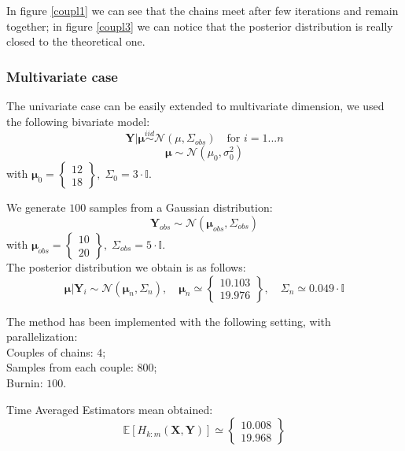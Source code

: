 \documentclass {article}
\begin{document}
In figure \ref{coupl1} we can see that the chains meet after few iterations and remain together; in figure \ref{coupl3} we can notice that the posterior distribution is really closed to the theoretical one.

\newpage

\subsubsection{Multivariate case}

The univariate case can be easily extended to multivariate dimension, we used the following bivariate model:
$$ \boldsymbol{Y} | \boldsymbol{\mu} \overset{iid}{\sim} \mathcal{N}(\mu, \Sigma_{obs} ) \quad \text{for } i = 1 ... n $$
$$ \boldsymbol{\mu}  \sim \mathcal{N}(\mu_0, \sigma_0^2)$$
with $\boldsymbol{\mu}_0 =
\begin{Bmatrix}    %
12 \\
18
\end{Bmatrix} 
, \; \Sigma_0 = 3 \cdot \mathbb{I}$.

We generate $100$ samples from a Gaussian distribution:
$$
\boldsymbol{Y}_{obs} \sim \mathcal{N}(\boldsymbol{\mu}_{obs}, \Sigma_{obs})
$$
with
$  \boldsymbol{\mu}_{obs} =
\begin{Bmatrix}  
	10 \\
 	20
\end{Bmatrix}  
, \;  \Sigma_{obs}  = 5 \cdot \mathbb{I}
$.\\

The posterior distribution we obtain is as follows:
$$  \boldsymbol{\mu} | \boldsymbol{Y}_i \sim \mathcal{N}(\boldsymbol{\mu}_n, \Sigma_n), 
\quad \boldsymbol{\mu}_n \simeq \begin{Bmatrix}    %
10.103 \\
19.976
\end{Bmatrix} ,
\quad
\Sigma_n
\simeq 0.049 \cdot \mathbb{I} $$

The method has been implemented with the following setting, with parallelization:\\
Couples of chains: $4$;\\
Samples from each couple: $800$;\\
Burnin: $100$.



Time Averaged Estimators mean obtained:
$$ \mathbb{E}[H_{k:m}(\boldsymbol{X},\boldsymbol{Y})] \simeq \begin{Bmatrix}    %
10.008 \\
19.968
\end{Bmatrix}$$
\end{document}
